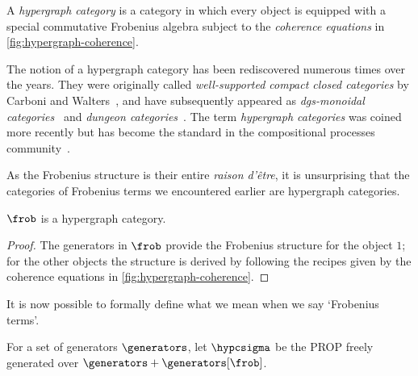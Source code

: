 \begin{definition}
    \label{def:hypergraph-category}
    A \emph{hypergraph category} is a category in which every object is equipped
    with a special commutative Frobenius algebra subject to the
    \emph{coherence equations} in \cref{fig:hypergraph-coherence}.
\end{definition}
%
%
%
\begin{remark}
    The notion of a hypergraph category has been
    rediscovered numerous times over the years.
    They were originally called \emph{well-supported compact closed categories}
    by Carboni and Walters~\cite{carboni1987cartesian}, and have subsequently
    appeared as
    \emph{dgs-monoidal categories}~\cite{katis1997bicategories,gadducci1998inductive,gadducci1999bicategorical,bruni2002normal}
    and \emph{dungeon categories}~\cite{morton2014belief}.
    The term \emph{hypergraph categories} was coined more recently but has
    become the standard in the compositional processes
    community~\cite{kissinger2015finite,fong2015decorated,baez2016compositional,baez2018compositional}.
\end{remark}

As the Frobenius structure is their entire \emph{raison d'\^{e}tre}, it is
unsurprising that the categories of Frobenius terms we encountered earlier are
hypergraph categories.

\begin{lemma}\label{lem:frob-hypergraph}
    \(\frob\) is a hypergraph category.
\end{lemma}
\begin{proof}
    The generators in \(\frob\) provide the Frobenius structure for the object
    \(1\); for the other objects the structure is derived by following the
    recipes given by the coherence equations in \cref{fig:hypergraph-coherence}.
\end{proof}

It is now possible to formally define what we mean when we say `Frobenius
terms'.

\begin{definition}
    For a set of generators \(\generators\), let \(\hypcsigma\) be the PROP
    freely generated over \(\generators + \generators[\frob]\).
\end{definition}

